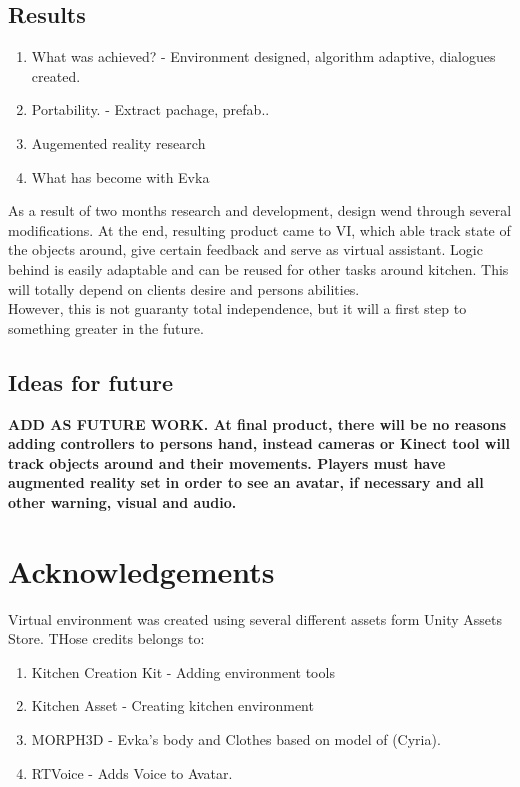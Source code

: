 \documentclass[18pt]{article}
\numberwithin{equation}{section} %
\numberwithin{figure}{section} %
\numberwithin{table}{section} %
\begin{document}
	\subsection{Results}
		\begin{enumerate}
			\item What was achieved? - Environment designed, algorithm adaptive, dialogues created.
			\item Portability. - Extract pachage, prefab..
			\item Augemented reality research
			\item What has become with Evka
		\end{enumerate}
		As a result of two months research and development, design wend through several modifications. At the end, resulting product came to VI, which able track state of the objects around, give certain feedback and serve as virtual assistant. Logic behind is easily adaptable and can be reused for other tasks around kitchen. This will totally depend on clients desire and persons abilities. \\
		
		However, this is not  guaranty total independence, but it will a first step to something greater in the future. \\
	\subsection{Ideas for future}
	
		\textbf{ ADD AS FUTURE WORK. At final product, there will be no reasons adding controllers to persons hand, instead cameras or Kinect tool will track objects around and their movements.  Players must have augmented reality set in order to see an avatar, if necessary and all other warning, visual and audio.\\}
	
\section{Acknowledgements}	
	Virtual environment was created using several different assets form Unity Assets Store. THose credits belongs to: 
	\begin{enumerate}
		\item Kitchen Creation Kit - Adding environment tools
		\item Kitchen Asset - Creating kitchen environment
		\item MORPH3D - Evka's body and Clothes based on model of (Cyria).
		\item RTVoice - Adds Voice to Avatar.
	\end{enumerate}
	
\end{document}
